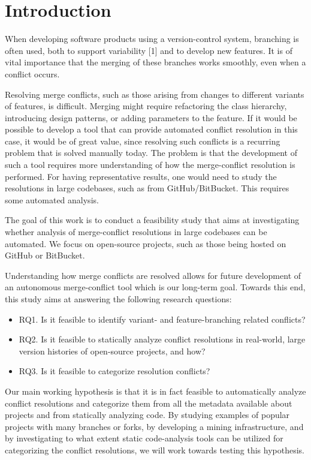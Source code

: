 \chapter{Introduction}
\setlength{\parindent}{0pt}
When developing software products using a version-control system, branching is often used, both to support variability [1] and to develop new features. It is of vital importance that the merging of these branches works smoothly, even when a conflict occurs.

Resolving merge conflicts, such as those arising from changes to different variants of features, is difficult. Merging might require refactoring the class hierarchy, introducing design patterns, or adding parameters to the feature. If it would be possible to develop a tool that can provide automated conflict resolution in this case, it would be of great value, since resolving such conflicts is a recurring problem that is solved manually today. The problem is that the development of such a tool requires more understanding of how the merge-conflict resolution is performed. For having representative results, one would need to study the resolutions in large codebases, such as from GitHub/BitBucket. This requires some automated analysis.

The goal of this work is to conduct a feasibility study that aims at investigating whether analysis of merge-conflict resolutions in large codebases can be automated. We focus on open-source projects, such as those being hosted on GitHub or BitBucket.

Understanding how merge conflicts are resolved allows for future development of an autonomous merge-conflict tool which is our long-term goal. Towards this end, this study aims at answering the following research questions:
\begin{itemize}
\item RQ1. Is it feasible to identify variant- and feature-branching related conflicts?
\item RQ2. Is it feasible to statically analyze conflict resolutions in real-world, large version histories of open-source projects, and how?
\item RQ3. Is it feasible to categorize resolution conflicts?
\end{itemize}

Our main working hypothesis is that it is in fact feasible to automatically analyze conflict resolutions and categorize them from all the metadata available about projects and from statically analyzing code. By studying examples of popular projects with many branches or forks, by developing a mining infrastructure, and by investigating to what extent static code-analysis tools can be utilized for categorizing the conflict resolutions, we will work towards testing this hypothesis.







